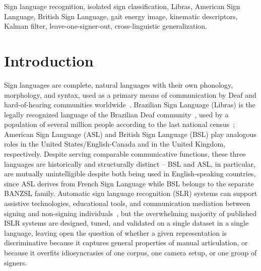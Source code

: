 \documentclass[journal]{IEEEtran}
\begin{document}
\begin{IEEEkeywords}
Sign language recognition, isolated sign classification, Libras, American Sign Language, British Sign Language, gait energy image, kinematic descriptors, Kalman filter, leave-one-signer-out, cross-linguistic generalization.
\end{IEEEkeywords}

\section{Introduction}
\label{sec:intro}

Sign languages are complete, natural languages with their own phonology, morphology, and syntax, used as a primary means of communication by Deaf and hard-of-hearing communities worldwide~\cite{quadros2004}. Brazilian Sign Language (Libras) is the legally recognized language of the Brazilian Deaf community~\cite{lei2002}, used by a population of several million people according to the last national census~\cite{ibge2010}; American Sign Language (ASL) and British Sign Language (BSL) play analogous roles in the United States/English-Canada and in the United Kingdom, respectively. Despite serving comparable communicative functions, these three languages are historically and structurally distinct -- BSL and ASL, in particular, are mutually unintelligible despite both being used in English-speaking countries, since ASL derives from French Sign Language while BSL belongs to the separate BANZSL family. Automatic sign language recognition (SLR) systems can support assistive technologies, educational tools, and communication mediation between signing and non-signing individuals~\cite{costa2025review,cheok2019review}, but the overwhelming majority of published ISLR systems are designed, tuned, and validated on a single dataset in a single language, leaving open the question of whether a given representation is discriminative because it captures general properties of manual articulation, or because it overfits idiosyncrasies of one corpus, one camera setup, or one group of signers.
\end{document}
